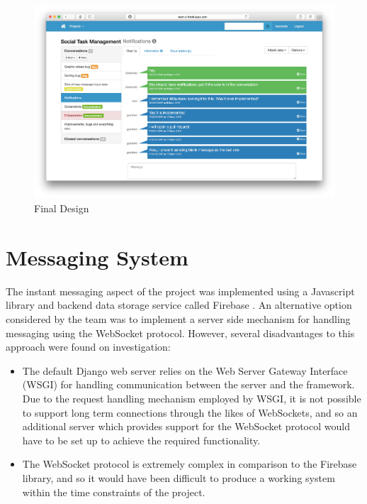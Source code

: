 \documentclass[a4paper]{l3proj}
\begin{document}
\begin{figure}[ht]
\centering
\includegraphics[scale=0.35]{finalproduct}
\caption{Final Design}
\label{figure:finalproduct}
\end{figure}

\section{Messaging System}
\label{messagingSystem}

The instant messaging aspect of the project was implemented using a Javascript library and backend data storage service called Firebase \cite{site:firebase}. An alternative option considered by the team was to implement a server side mechanism for handling messaging using the WebSocket \cite{site:websockets} protocol. However, several disadvantages to this approach were found on investigation:

\begin{itemize}
\item The default Django web server relies on the Web Server Gateway Interface (WSGI) \cite{site:python-webserver} for handling communication between the server and the framework. Due to the request handling mechanism employed by WSGI, it is not possible to support long term connections through the likes of WebSockets, and so an additional server which provides support for the WebSocket protocol would have to be set up to achieve the required functionality.
\item The WebSocket protocol is extremely complex in comparison to the Firebase library, and so it would have been difficult to produce a working system within the time constraints of the project.
\end{itemize}
\end{document}
